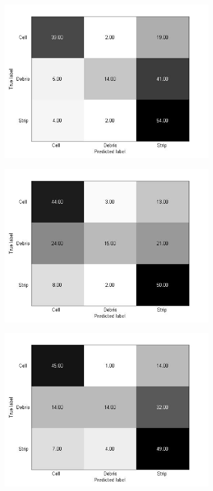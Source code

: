 \begin{figure}[!h]
\begin{subfigure}[b]{0.3\textwidth}
    \includegraphics[width=\textwidth]{confusion_matrix/fig3_4_c.jpg}
    \caption{}
  \end{subfigure}
  \begin{subfigure}[b]{0.3\textwidth}
    \includegraphics[width=\textwidth]{confusion_matrix/fig3_4_d.jpg}
    \caption{}
  \end{subfigure}
  \begin{subfigure}[b]{0.3\textwidth}
    \includegraphics[width=\textwidth]{confusion_matrix/fig3_4_e.jpg}

\end{subfigure}
\end{figure}
